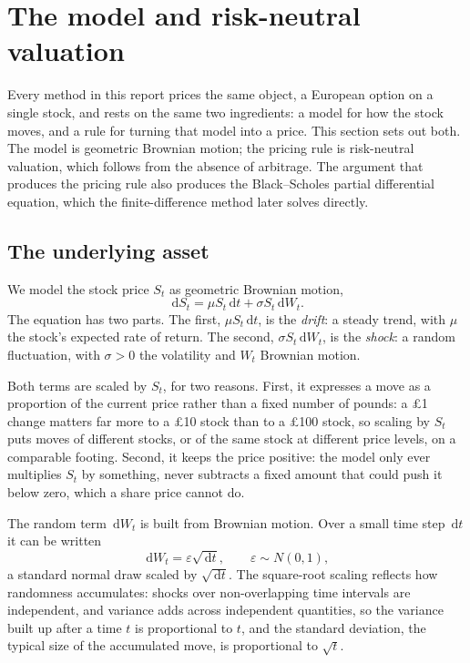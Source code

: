 \documentclass[11pt,a4paper]{article}
\numberwithin{equation}{section}
\theoremstyle{definition}
\theoremstyle{plain}
\theoremstyle{remark}
\newcommand{\dd}{\,\mathrm{d}}
\begin{document}
\section{The model and risk-neutral valuation}\label{sec:model}

Every method in this report prices the same object, a European option on a
single stock, and rests on the same two ingredients: a model for how the stock
moves, and a rule for turning that model into a price. This section sets out
both. The model is geometric Brownian motion; the pricing rule is risk-neutral
valuation, which follows from the absence of arbitrage. The argument that
produces the pricing rule also produces the Black--Scholes partial differential
equation, which the finite-difference method later solves directly.

\subsection{The underlying asset}

We model the stock price $S_t$ as geometric Brownian motion,
\begin{equation}\label{eq:gbm}
  \dd S_t = \mu S_t \dd t + \sigma S_t \dd W_t.
\end{equation}
The equation has two parts. The first, $\mu S_t \dd t$, is the \emph{drift}: a
steady trend, with $\mu$ the stock's expected rate of return. The second,
$\sigma S_t \dd W_t$, is the \emph{shock}: a random fluctuation, with
$\sigma > 0$ the volatility and $W_t$ Brownian motion.

Both terms are scaled by $S_t$, for two reasons. First, it expresses a move as
a proportion of the current price rather than a fixed number of pounds: a £1
change matters far more to a £10 stock than to a £100 stock, so scaling by
$S_t$ puts moves of different stocks, or of the same stock at different price
levels, on a comparable footing. Second, it keeps the price positive: the
model only ever multiplies $S_t$ by something, never subtracts a fixed amount
that could push it below zero, which a share price cannot do.

The random term $\dd W_t$ is built from Brownian motion. Over a small time
step $\dd t$ it can be written
\[
  \dd W_t = \varepsilon \sqrt{\dd t}, \qquad \varepsilon \sim N(0,1),
\]
a standard normal draw scaled by $\sqrt{\dd t}$. The square-root scaling
reflects how randomness accumulates: shocks over non-overlapping time
intervals are independent, and variance adds across independent quantities, so
the variance built up after a time $t$ is proportional to $t$, and the
standard deviation, the typical size of the accumulated move, is
proportional to $\sqrt{t}$.
\end{document}
